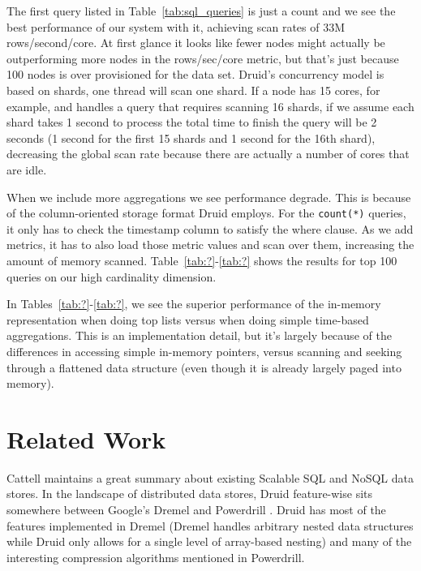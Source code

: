 \documentclass{vldb}
\begin{document}

The first query listed in Table~\ref{tab:sql_queries} is just a count and we see the best
performance of our system with it, achieving scan rates of 33M
rows/second/core.  At first glance it looks like fewer nodes might
actually be outperforming more nodes in the rows/sec/core metric, but
that's just because 100 nodes is over provisioned for the data set.
Druid's concurrency model is based on shards, one thread will scan one
shard.  If a node has 15 cores, for example, and handles a query that
requires scanning 16 shards, if we assume each shard takes 1 second to
process the total time to finish the query will be 2 seconds (1 second
for the first 15 shards and 1 second for the 16th shard), decreasing
the global scan rate because there are actually a number of cores that
are idle.

When we include more aggregations we see performance degrade.  This is
because of the column-oriented storage format Druid employs.  For the
\texttt{count(*)} queries, it only has to check the timestamp column to satisfy
the where clause.  As we add metrics, it has to also load those metric
values and scan over them, increasing the amount of memory scanned.
Table~\ref{tab:?}-\ref{tab:?} shows the results for top 100 queries on our high
cardinality dimension.

In Tables~\ref{tab:?}-\ref{tab:?}, we see the superior performance of the in-memory
representation when doing top lists versus when doing simple
time-based aggregations.  This is an implementation detail, but it's
largely because of the differences in accessing simple in-memory
pointers, versus scanning and seeking through a flattened data
structure (even though it is already largely paged into memory).

\section{Related Work}
\label{sec:related}
Cattell \cite{cattell2011scalable} maintains a great summary about existing Scalable SQL and
NoSQL data stores. In the landscape of distributed data stores, Druid
feature-wise sits somewhere between Google’s Dremel \cite{melnik2010dremel} and Powerdrill
\cite{hall2012processing}. Druid has most of the features implemented in Dremel (Dremel
handles arbitrary nested data structures while Druid only allows for a
single level of array-based nesting) and many of the interesting
compression algorithms mentioned in Powerdrill.
\end{document}
